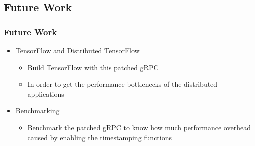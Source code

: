 \documentclass[10pt]{beamer}
\begin{document}
\subsection{Future Work}
\begin{frame}
\frametitle{Future Work}
\begin{itemize}
\item TensorFlow and Distributed TensorFlow
    \begin{itemize}
        \item Build TensorFlow with this patched gRPC
        \item In order to get the performance bottlenecks of the distributed applications
    \end{itemize}
\item Benchmarking
    \begin{itemize}
        \item Benchmark the patched gRPC to know how much performance overhead caused by enabling the timestamping functions
    \end{itemize}
\end{itemize}
\end{frame}


%
%
%


\end{document}
